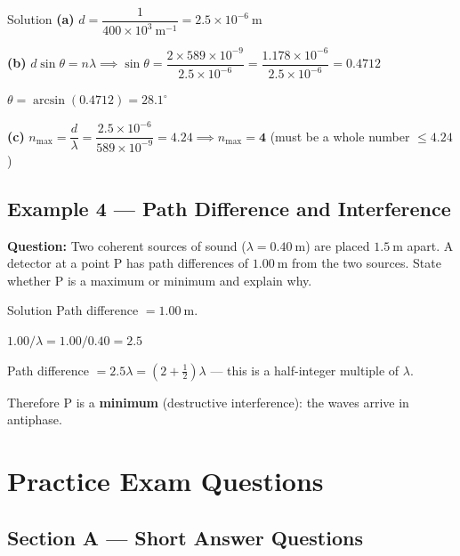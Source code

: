 \begin{examplebox}{Solution}
\textbf{(a)} $d = \dfrac{1}{400\times10^3\ \text{m}^{-1}} = 2.5\times10^{-6}\ \text{m}$

\vspace{0.3em}
\textbf{(b)} $d\sin\theta = n\lambda \implies \sin\theta = \dfrac{2\times589\times10^{-9}}{2.5\times10^{-6}} = \dfrac{1.178\times10^{-6}}{2.5\times10^{-6}} = 0.4712$

$\theta = \arcsin(0.4712) = \mathbf{28.1^\circ}$

\vspace{0.3em}
\textbf{(c)} $n_{\max} = \dfrac{d}{\lambda} = \dfrac{2.5\times10^{-6}}{589\times10^{-9}} = 4.24 \implies n_{\max} = \mathbf{4}$ (must be a whole number $\leq 4.24$)
\end{examplebox}

\subsection*{Example 4 --- Path Difference and Interference}

\textbf{Question:} Two coherent sources of sound ($\lambda = 0.40\ \text{m}$) are placed $1.5\ \text{m}$ apart. A detector at a point P has path differences of $1.00\ \text{m}$ from the two sources. State whether P is a maximum or minimum and explain why.

\begin{examplebox}{Solution}
Path difference $= 1.00\ \text{m}$.

$1.00/\lambda = 1.00/0.40 = 2.5$

Path difference $= 2.5\lambda = (2 + \tfrac{1}{2})\lambda$ — this is a half-integer multiple of $\lambda$.

Therefore P is a \textbf{minimum} (destructive interference): the waves arrive in antiphase.
\end{examplebox}




\section{Practice Exam Questions}

\subsection*{Section A --- Short Answer Questions}

